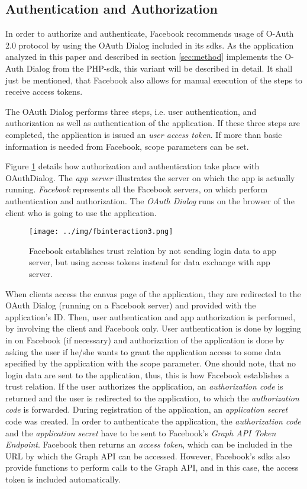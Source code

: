 \documentclass[preprint,12pt]{elsarticle}
\begin{document}
\subsection{Authentication and Authorization}
\label{sec:auth-auth}
In order to authorize and authenticate, Facebook recommends usage of
O-Auth 2.0 protocol by using the OAuth Dialog included in its
\ac{sdks}. As the application analyzed in this paper and described in section 
\ref{sec:method} implements the O-Auth Dialog from the PHP-\ac{sdk},
this variant will be described in detail. It shall just be mentioned,
that Facebook also allows for manual execution of the steps to receive
access tokens.\cite{facebookDevAuth}  

The OAuth Dialog performs three steps, i.e. user authentication, 
and authorization as well as authentication of the
application. If these three steps are completed, the application is
issued an \textit{user access token}. If more than basic information
is needed from Facebook, scope parameters can be set.\cite{facebookDevAuth}

Figure \ref{fig:authorization} details how authorization and
authentication take place with OAuthDialog. The \textit{app server}
illustrates the server on which the app is actually
running. \textit{Facebook} represents all the Facebook servers, on
which perform authentication and authorization. The \textit{OAuth
  Dialog} runs on the browser of the client who is going to use the
application.


\begin{figure}
\label{fig:authorization}
  \texttt{[image: ../img/fbinteraction3.png]}
  \caption{Facebook establishes trust relation by not sending login
    data to app server, but using access tokens instead for
    data exchange with app server.}
\end{figure}

When clients access the canvas page of the application, they are
redirected to the OAuth Dialog (running on a Facebook server) and
provided with the application's ID. Then, user authentication and
app authorization is performed, by involving the client and Facebook
only. User authentication is done by logging in on Facebook (if necessary) and
authorization of the application is done by asking the user if he/she
wants to grant the application access to some data specified by the
application with the scope parameter. One should note, that no
login data are sent to the application, thus, this is how Facebook
establishes a trust relation. 
If the user authorizes the application, an \textit{authorization code} is returned and
the user is redirected to the application, to which the
\textit{authorization code} is forwarded. During registration of the
application, an \textit{application secret} code was
created. In order to authenticate the application, the
\textit{authorization code} and the \textit{application secret} have
to be sent to Facebook's \textit{Graph API Token Endpoint}. Facebook
then returns an \textit{access token}, which can be included in the
URL by which the Graph API can be accessed. However, Facebook's
\ac{sdks} also provide functions to perform calls to the Graph API,
and in this case, the access token is included automatically.
\end{document}
